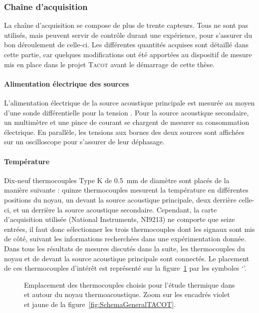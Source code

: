 \subsubsection{Chaîne d'acquisition}
La chaîne d'acquisition se compose de plus de trente capteurs. Tous ne sont pas utilisés, mais peuvent servir de contrôle durant une expérience, pour s'assurer du bon déroulement de celle-ci. Les différentes quantités acquises sont détaillé dans cette partie, car quelques modifications ont été apportées au dispositif de mesure mis en place dans le projet \textsc{Tacot} avant le démarrage de cette thèse.

\paragraph{Alimentation électrique des sources} L'alimentation électrique de la source acoustique principale est mesurée au moyen d'une sonde différentielle pour la tension . Pour la source acoustique secondaire, un multimètre  et une pince de courant  se chargent de mesurer sa consommation électrique. En parallèle, les tensions aux bornes des deux sources sont affichées sur un oscilloscope pour s'assurer de leur déphasage.

\paragraph{Température} Dix-neuf thermocouples Type K de \qty{.5}{\milli\meter} de diamètre sont placés de la manière suivante : quinze thermocouples mesurent la température en différentes positions du noyau, un devant la source acoustique principale, deux derrière celle-ci, et un derrière la source acoustique secondaire. Cependant, la carte d'acquisition utilisée (National Instruments, NI9213) ne comporte que seize entrées, il faut donc sélectionner les trois thermocouples dont les signaux sont mis de côté, suivant les informations recherchées dans une expérimentation donnée. Dans tous les résultats de mesures discutés dans la suite, les thermocouples du noyau et de devant la source acoustique principale sont connectés. Le placement de ces thermocouples d'intérêt est représenté sur la figure~\ref{fig:TCdansNoyau} par les symboles `\textcolor{cyan}{\textbullet}'.

\begin{figure}[!ht]
    \centering
    
    \caption{Emplacement des thermocouples choisis pour l'étude thermique dans et autour du noyau thermoacoustique. Zoom sur les encadrés violet et jaune de la figure~\ref{fig:SchemaGeneralTACOT}.}
    \label{fig:TCdansNoyau}
\end{figure}

